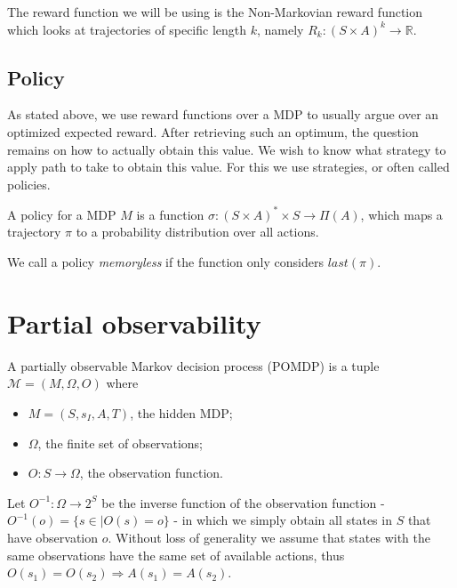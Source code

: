 The reward function we will be using is the Non-Markovian reward function which looks at trajectories of specific length $k$, namely $R_k:(S\times A)^k\to\mathbb{R}$. 



\subsection*{Policy}
As stated above, we use reward functions over a MDP to usually argue over an optimized expected reward. After retrieving such an optimum, the question remains on how to actually obtain this value. We wish to know what strategy to apply path to take to obtain this value. For this we use strategies, or often called policies. 

\begin{definition}
	A policy for a MDP $M$ is a function $\sigma:(S\times A)^*\times S \to \Pi(A)$, which maps a trajectory $\pi$ to a probability distribution over all actions. 
\end{definition}

We call a policy \textit{memoryless} if the function only considers $last(\pi)$. 


\section{Partial observability}

\begin{definition}[POMDP]
	A partially observable Markov decision process (POMDP) is a tuple $\mathcal{M}=(M, \Omega, O)$ where 
	\begin{itemize}
		\item $M=(S,s_I,A,T)$, the hidden MDP;
		\item $\Omega$, the finite set of observations;
		\item $O:S\to \Omega$, the observation function. %
	\end{itemize}
\end{definition}

Let $O^{-1}:\Omega\to 2^S$ be the inverse function of the observation function - $O^{-1}(o)=\{s\in \mid O(s)=o\}$ - in which we simply obtain all states in $S$ that have observation $o$.
Without loss of generality we assume that states with the same observations have the same set of available actions, thus $O(s_1)=O(s_2)\Rightarrow A(s_1)=A(s_2)$.

